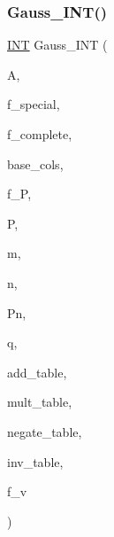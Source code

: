 \subsubsection{\texorpdfstring{Gauss\+\_\+\+I\+N\+T()}{Gauss\_INT()}}
{\footnotesize\ttfamily \mbox{\hyperlink{galois_8h_a09fddde158a3a20bd2dcadb609de11dc}{I\+NT}} Gauss\+\_\+\+I\+NT (\begin{DoxyParamCaption}\item[{\mbox{\hyperlink{galois_8h_a09fddde158a3a20bd2dcadb609de11dc}{I\+NT}} $\ast$}]{A,  }\item[{\mbox{\hyperlink{galois_8h_a09fddde158a3a20bd2dcadb609de11dc}{I\+NT}}}]{f\+\_\+special,  }\item[{\mbox{\hyperlink{galois_8h_a09fddde158a3a20bd2dcadb609de11dc}{I\+NT}}}]{f\+\_\+complete,  }\item[{\mbox{\hyperlink{galois_8h_a09fddde158a3a20bd2dcadb609de11dc}{I\+NT}} $\ast$}]{base\+\_\+cols,  }\item[{\mbox{\hyperlink{galois_8h_a09fddde158a3a20bd2dcadb609de11dc}{I\+NT}}}]{f\+\_\+P,  }\item[{\mbox{\hyperlink{galois_8h_a09fddde158a3a20bd2dcadb609de11dc}{I\+NT}} $\ast$}]{P,  }\item[{\mbox{\hyperlink{galois_8h_a09fddde158a3a20bd2dcadb609de11dc}{I\+NT}}}]{m,  }\item[{\mbox{\hyperlink{galois_8h_a09fddde158a3a20bd2dcadb609de11dc}{I\+NT}}}]{n,  }\item[{\mbox{\hyperlink{galois_8h_a09fddde158a3a20bd2dcadb609de11dc}{I\+NT}}}]{Pn,  }\item[{\mbox{\hyperlink{galois_8h_a09fddde158a3a20bd2dcadb609de11dc}{I\+NT}}}]{q,  }\item[{\mbox{\hyperlink{galois_8h_a09fddde158a3a20bd2dcadb609de11dc}{I\+NT}} $\ast$}]{add\+\_\+table,  }\item[{\mbox{\hyperlink{galois_8h_a09fddde158a3a20bd2dcadb609de11dc}{I\+NT}} $\ast$}]{mult\+\_\+table,  }\item[{\mbox{\hyperlink{galois_8h_a09fddde158a3a20bd2dcadb609de11dc}{I\+NT}} $\ast$}]{negate\+\_\+table,  }\item[{\mbox{\hyperlink{galois_8h_a09fddde158a3a20bd2dcadb609de11dc}{I\+NT}} $\ast$}]{inv\+\_\+table,  }\item[{\mbox{\hyperlink{galois_8h_a09fddde158a3a20bd2dcadb609de11dc}{I\+NT}}}]{f\+\_\+v }\end{DoxyParamCaption})}

\mbox{\label{global_8_c_a5bcfc62557daf60e1d841ca1fcffda03}} 
